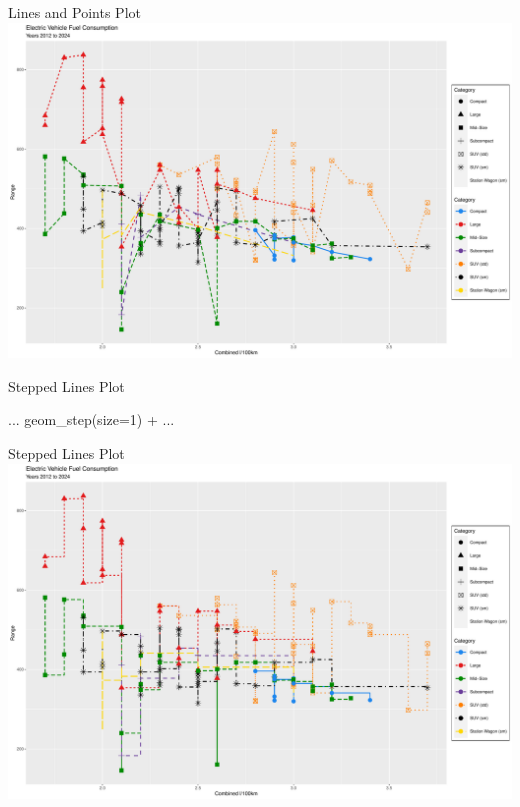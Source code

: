 \documentclass[ignorenonframetext,xcolor=x11names]{beamer}
\begin{document}
\begin{frame}{Lines and Points Plot}
  \includegraphics[width=\textwidth]{fuel.linesPoints.pdf}
\end{frame}

\begin{frame}[fragile]{Stepped Lines Plot}
\footnotesize
\begin{Rcode}
...
     geom_step(size=1) + 
... 
\end{Rcode}
\end{frame}

\begin{frame}{Stepped Lines Plot}
  \includegraphics[width=\textwidth]{fuel.steps.pdf}
\end{frame}
\end{document}
